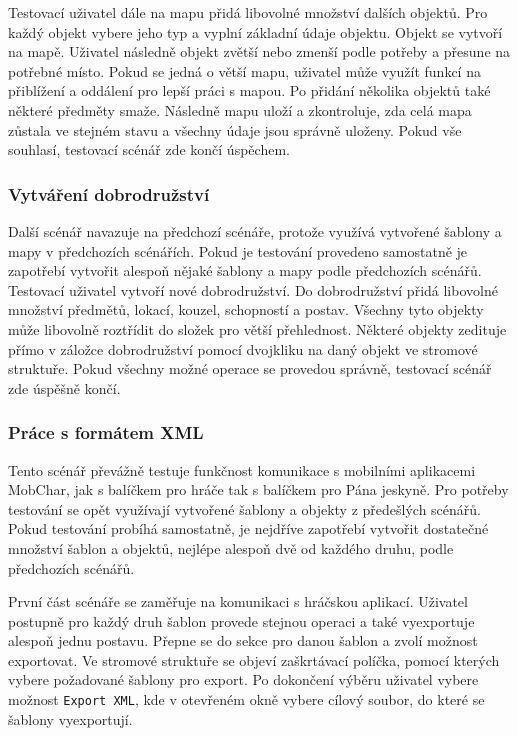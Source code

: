 \documentclass[thesis=B,czech]{resources/FITthesis}[2012/06/26]
\begin{document}
Testovací uživatel dále na mapu přidá libovolné množství dalších objektů. Pro každý objekt vybere jeho typ a vyplní základní údaje objektu. Objekt se vytvoří na mapě. Uživatel následně objekt zvětší nebo zmenší podle potřeby a přesune na potřebné místo. Pokud se jedná o větší mapu, uživatel může využít funkcí na přiblížení a oddálení pro lepší práci s mapou. Po přidání několika objektů také některé předměty smaže. Následně mapu uloží a zkontroluje, zda celá mapa zůstala ve stejném stavu a všechny údaje jsou správně uloženy. Pokud vše souhlasí, testovací scénář zde končí úspěchem. 

\subsubsection{Vytváření dobrodružství}
Další scénář navazuje na předchozí scénáře, protože využívá vytvořené šablony a mapy v předchozích scénářích. Pokud je testování provedeno samostatně je zapotřebí vytvořit alespoň nějaké šablony a mapy podle předchozích scénářů. Testovací uživatel vytvoří nové dobrodružství. Do dobrodružství přidá libovolné množství předmětů, lokací, kouzel, schopností a postav. Všechny tyto objekty může libovolně roztřídit do složek pro větší přehlednost. Některé objekty zedituje přímo v záložce dobrodružství pomocí dvojkliku na daný objekt ve stromové struktuře. Pokud všechny možné operace se provedou správně, testovací scénář zde úspěšně končí.

\subsubsection{Práce s formátem XML}
Tento scénář převážně testuje funkčnost komunikace s mobilními aplikacemi MobChar, jak s balíčkem pro hráče tak s balíčkem pro Pána jeskyně. Pro potřeby testování se opět využívají vytvořené šablony a objekty z předešlých scénářů. Pokud testování probíhá samostatně, je nejdříve zapotřebí vytvořit dostatečné množství šablon a objektů, nejlépe alespoň dvě od každého druhu, podle předchozích scénářů. \par

První část scénáře se zaměřuje na komunikaci s hráčskou aplikací. Uživatel postupně pro každý druh šablon provede stejnou operaci a také vyexportuje alespoň jednu postavu. Přepne se do sekce pro danou šablon a zvolí možnost exportovat. Ve stromové struktuře se objeví zaškrtávací políčka, pomocí kterých vybere požadované šablony pro export. Po dokončení výběru uživatel vybere možnost \texttt{Export XML}, kde v otevřeném okně vybere cílový soubor, do které se šablony vyexportují. \par
\end{document}
